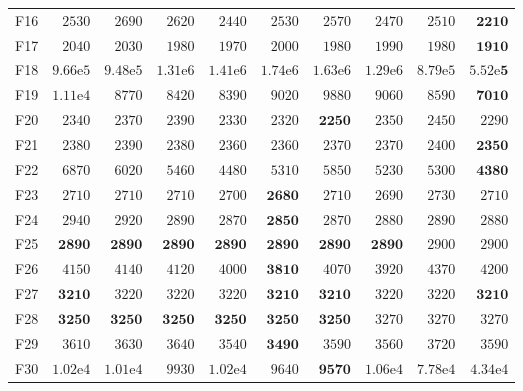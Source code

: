 \begin{tabular}{lrrrrrrrrr}
F16 & $2530$ & $2690$ & $2620$ & $2440$ & $2530$ & $2570$ & $2470$ & $2510$ & $\mathbf{2210}$ \\
F17 & $2040$ & $2030$ & $1980$ & $1970$ & $2000$ & $1980$ & $1990$ & $1980$ & $\mathbf{1910}$ \\
F18 & $9.66\mathrm{e}{5}$ & $9.48\mathrm{e}{5}$ & $1.31\mathrm{e}{6}$ & $1.41\mathrm{e}{6}$ & $1.74\mathrm{e}{6}$ & $1.63\mathrm{e}{6}$ & $1.29\mathrm{e}{6}$ & $8.79\mathrm{e}{5}$ & $\mathbf{5.52\mathrm{e}{5}}$ \\
F19 & $1.11\mathrm{e}{4}$ & $8770$ & $8420$ & $8390$ & $9020$ & $9880$ & $9060$ & $8590$ & $\mathbf{7010}$ \\
F20 & $2340$ & $2370$ & $2390$ & $2330$ & $2320$ & $\mathbf{2250}$ & $2350$ & $2450$ & $2290$ \\
F21 & $2380$ & $2390$ & $2380$ & $2360$ & $2360$ & $2370$ & $2370$ & $2400$ & $\mathbf{2350}$ \\
F22 & $6870$ & $6020$ & $5460$ & $4480$ & $5310$ & $5850$ & $5230$ & $5300$ & $\mathbf{4380}$ \\
F23 & $2710$ & $2710$ & $2710$ & $2700$ & $\mathbf{2680}$ & $2710$ & $2690$ & $2730$ & $2710$ \\
F24 & $2940$ & $2920$ & $2890$ & $2870$ & $\mathbf{2850}$ & $2870$ & $2880$ & $2890$ & $2880$ \\
F25 & $\mathbf{2890}$ & $\mathbf{2890}$ & $\mathbf{2890}$ & $\mathbf{2890}$ & $\mathbf{2890}$ & $\mathbf{2890}$ & $\mathbf{2890}$ & $2900$ & $2900$ \\
F26 & $4150$ & $4140$ & $4120$ & $4000$ & $\mathbf{3810}$ & $4070$ & $3920$ & $4370$ & $4200$ \\
F27 & $\mathbf{3210}$ & $3220$ & $3220$ & $3220$ & $\mathbf{3210}$ & $\mathbf{3210}$ & $3220$ & $3220$ & $\mathbf{3210}$ \\
F28 & $\mathbf{3250}$ & $\mathbf{3250}$ & $\mathbf{3250}$ & $\mathbf{3250}$ & $\mathbf{3250}$ & $\mathbf{3250}$ & $3270$ & $3270$ & $3270$ \\
F29 & $3610$ & $3630$ & $3640$ & $3540$ & $\mathbf{3490}$ & $3590$ & $3560$ & $3720$ & $3590$ \\
F30 & $1.02\mathrm{e}{4}$ & $1.01\mathrm{e}{4}$ & $9930$ & $1.02\mathrm{e}{4}$ & $9640$ & $\mathbf{9570}$ & $1.06\mathrm{e}{4}$ & $7.78\mathrm{e}{4}$ & $4.34\mathrm{e}{4}$ \\
\bottomrule
\end{tabular}
